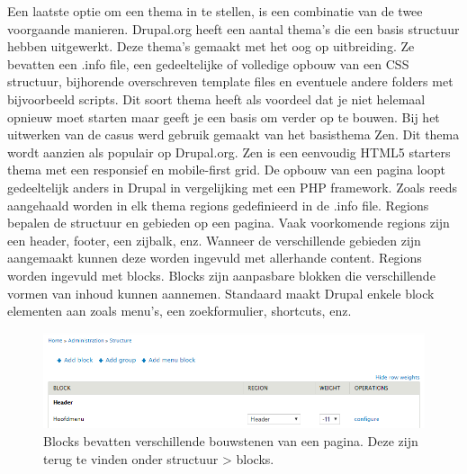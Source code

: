 \noindent
Een laatste optie om een thema in te stellen, is een combinatie van de twee voorgaande manieren. Drupal.org heeft een aantal thema's die een basis structuur hebben uitgewerkt. Deze thema's gemaakt met het oog op uitbreiding. Ze bevatten een .info file, een gedeeltelijke of volledige opbouw van een CSS structuur, bijhorende overschreven template files en eventuele andere folders met bijvoorbeeld scripts. Dit soort thema heeft als voordeel dat je niet helemaal opnieuw moet starten maar geeft je een basis om verder op te bouwen. 
\newline\newline
Bij het uitwerken van de casus werd gebruik gemaakt van het basisthema Zen. Dit thema wordt aanzien als populair op Drupal.org. Zen is een eenvoudig HTML5 starters thema met een responsief en mobile-first grid. 
\newline\newline
De opbouw van een pagina loopt gedeeltelijk anders in Drupal in vergelijking met een PHP framework. Zoals reeds aangehaald worden in elk thema regions gedefinieerd in de .info file. Regions bepalen de structuur en gebieden op een pagina. Vaak voorkomende regions zijn een header, footer, een zijbalk, enz. Wanneer de verschillende gebieden zijn aangemaakt kunnen deze worden ingevuld met allerhande content. Regions worden ingevuld met blocks. Blocks zijn aanpasbare blokken die verschillende vormen van inhoud kunnen aannemen. Standaard maakt Drupal enkele block elementen aan zoals menu's, een zoekformulier, shortcuts, enz.

\begin{figure}[!ht]
  \includegraphics[width=\textwidth]{img/dr-theme-blocks.png}
  \centering
  \caption{Blocks bevatten verschillende bouwstenen van een pagina. Deze zijn terug te vinden onder structuur > blocks.}
  \label{fig:Drupal thema Blocks.}
\end{figure}

